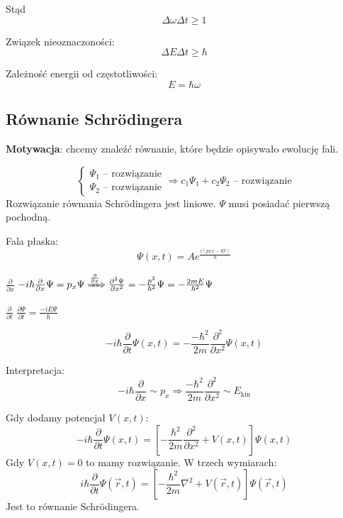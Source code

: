 Stąd
\[
\Delta \omega \Delta t \geq 1
\]

Związek nieoznaczoności:
\[
\Delta E \Delta t \geq \hbar
\]

Zależność energii od częstotliwości:
\[
E = \hbar \omega
\]

\subsection{Równanie Schrödingera}

\textbf{Motywacja}: chcemy znaleźć równanie, które będzie opisywało ewolucję fali.

\[
\begin{cases}
    \Psi_1 \text{ -- rozwiązanie} \\
    \Psi_2 \text{ -- rozwiązanie}
\end{cases} \Rightarrow c_1 \Psi_1 + c_2 \Psi_2 \text{ -- rozwiązanie}
\]
Rozwiązanie równania Schrödingera jest liniowe. $\Psi$ musi posiadać pierwszą pochodną.

Fala płaska:
\[
\Psi(x,t) = A e^{\frac{i(px x - Et)}{\hbar}}
\]

$\frac{\partial}{\partial x}$ $-i \hbar \frac{\partial}{\partial x} \Psi = p_x \Psi \xRightarrow{\frac{\partial}{\partial x}} \frac{\partial^2\Psi}{\partial x^2} = -\frac{p^2}{\hbar^2} \Psi = -\frac{2mE}{\hbar^2} \Psi$

$\frac{\partial}{\partial t}$ $\frac{\partial\Psi}{\partial t} = \frac{-iE\Psi}{\hbar}$

\[
-i\hbar \frac{\partial}{\partial t} \Psi(x, t) = -\frac{-\hbar^2}{2m} \frac{\partial^2}{\partial x^2} \Psi(x, t)
\]

Interpretacja:
\[
-i\hbar \frac{\partial}{\partial x} \sim p_x \Rightarrow \frac{-\hbar^2}{2m} \frac{\partial^2}{\partial x^2} \sim E_{\text{kin}}
\]

Gdy dodamy potencjał $V(x,t)$:
\[
-i\hbar \frac{\partial}{\partial t} \Psi(x,t) = \left[ -\frac{\hbar^2}{2m} \frac{\partial^2}{\partial x^2} + V(x,t) \right] \Psi(x,t)
\]
Gdy $V(x,t) = 0$ to mamy rozwiązanie.
W trzech wymiarach:
\[
i\hbar \frac{\partial}{\partial t} \Psi(\vec{r},t) = \left[ -\frac{\hbar^2}{2m} \nabla^2 + V(\vec{r},t) \right] \Psi(\vec{r},t)
\]
Jest to równanie Schrödingera.
